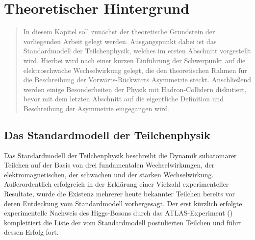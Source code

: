 


\chapter{Theoretischer Hintergrund}

\begin{quote}
    In diesem Kapitel soll zunächst der theoretische Grundstein der
    vorliegenden Arbeit gelegt werden. Ausgangspunkt dabei ist das
    Standardmodell der Teilchenphysik, welches im ersten Abschnitt vorgestellt
    wird. Hierbei wird nach einer kurzen Einführung der Schwerpunkt auf die
    elektroschwache Wechselwirkung gelegt, die den theoretischen Rahmen für die
    Beschreibung der Vorwärts-Rückwärts Asymmetrie steckt. Anschließend werden
    einige Besonderheiten der Physik mit Hadron-Collidern diskutiert, bevor mit
    dem letzten Abschnitt auf die eigentliche Definition und Beschreibung der
    Asymmetrie eingegangen wird.
\end{quote}



\section{Das Standardmodell der Teilchenphysik}
\label{theory:standardmodell}


Das Standardmodell der Teilchenphysik beschreibt die Dynamik subatomarer
Teilchen auf der Basis von drei fundamentalen Wechselwirkungen, der
elektromagnetischen, der schwachen und der starken Wechselwirkung.
Außerordentlich erfolgreich in der Erklärung einer Vielzahl experimenteller
Resultate, wurde die Existenz mehrerer heute bekannter Teilchen bereits vor
deren Entdeckung vom Standardmodell vorhergesagt. Der erst kürzlich erfolgte
experimentelle Nachweis des Higgs-Bosons durch das ATLAS-Experiment
(\cite{Aad:2012tfa}) komplettiert die Liste der vom Standardmodell postulierten
Teilchen und führt dessen Erfolg fort.

